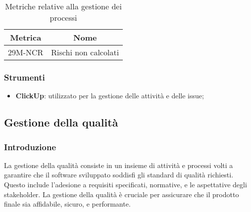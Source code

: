 \begin{table}[h]
	\centering
	\begin{tabular}{|c|c|}
		\hline
		\textbf{Metrica} & \textbf{Nome}             \\
		\hline
		29M-NCR         & Rischi non calcolati \\
		\hline
	\end{tabular}
	\caption{Metriche relative alla gestione dei processi}
\end{table}

\subsubsection{Strumenti}
\begin{itemize}
	\item \textbf{ClickUp}: utilizzato per la gestione delle attività e delle issue;
\end{itemize}

\subsection{Gestione della qualità}
\subsubsection{Introduzione}
La gestione della qualità consiste in un insieme di attività e processi volti a garantire che il software sviluppato soddisfi gli standard di qualità richiesti. Questo include l'adesione a requisiti specificati, normative, e le aspettative degli stakeholder. La gestione della qualità è cruciale per assicurare che il prodotto finale sia affidabile, sicuro, e performante.

